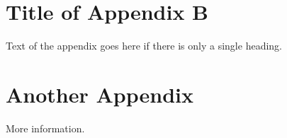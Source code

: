 \section{Title of Appendix B}

Text of the appendix goes here if there is only a single heading. 

\section{Another Appendix}
More information.